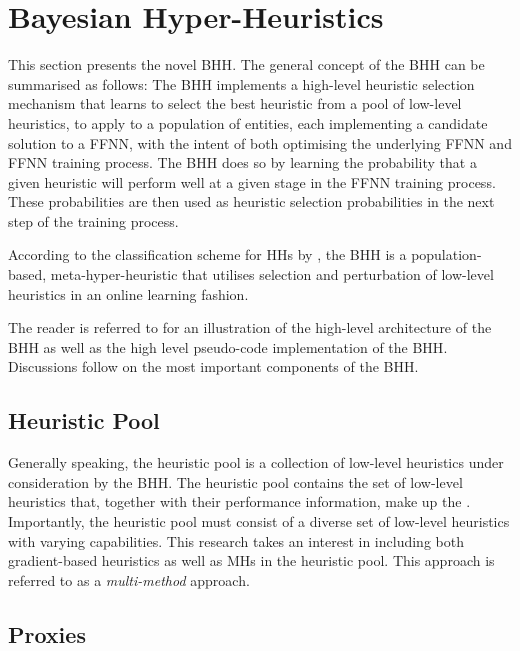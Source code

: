 \section{Bayesian Hyper-Heuristics}
\label{sec:bhh}

This section presents the novel \acs{BHH}. The general concept of the \acs{BHH} can be summarised as follows: The \acs{BHH} implements a high-level heuristic selection mechanism that learns to select the best heuristic from a pool of low-level heuristics, to apply to a population of entities, each implementing a candidate solution to a \acs{FFNN}, with the intent of both optimising the underlying \acs{FFNN} and \acs{FFNN} training process. The \acs{BHH} does so by learning the probability that a given heuristic will perform well at a given stage in the \acs{FFNN} training process. These probabilities are then used as heuristic selection probabilities in the next step of the training process.

According to the classification scheme for \acp{HH} by \citeauthor{ref:burke:2010} \cite{ref:burke:2010}, the \acs{BHH} is a population-based, meta-hyper-heuristic that utilises selection and perturbation of low-level heuristics in an online learning fashion.

The reader is referred to \cite{ref:schreuder:2022} for an illustration of the high-level architecture of the \acs{BHH} as well as the high level pseudo-code implementation of the \acs{BHH}. Discussions follow on the most important components of the \acs{BHH}.

\subsection{Heuristic Pool}\label{sec:bhh:heuristic_pool}

Generally speaking, the heuristic pool is a collection of low-level heuristics under consideration by the \acs{BHH}. The heuristic pool contains the set of low-level heuristics that, together with their performance information, make up the . Importantly, the heuristic pool must consist of a diverse set of low-level heuristics with varying capabilities. This research takes an interest in including both gradient-based heuristics as well as \acp{MH} in the heuristic pool. This approach is referred to as a \textit{multi-method} approach.

\subsection{Proxies}\label{sec:bhh:heuristic:proxies}

